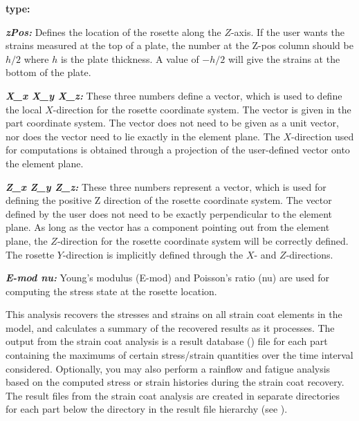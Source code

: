 {\begin{namelist}{\bf type:}
\item[\sl\textbf{zPos:}]
  Defines the location of the rosette along the $Z$-axis.
  If the user wants the strains measured at the top of a plate, the number at
  the Z-pos column should be $h/2$ where $h$ is the plate thickness.
  A value of $-h/2$ will give the strains at the bottom of the plate.

\item[\sl\textbf{X\_x X\_y X\_z:}]
  These three numbers define a vector, which is used to define the local
  $X$-direction for the rosette coordinate system. The vector is given in
  the part coordinate system. The vector does not need to be given as a unit
  vector, nor does the vector need to lie exactly in the element plane.
  The $X$-direction used for computations is obtained through a projection
  of the user-defined vector onto the element plane.

\item[\sl\textbf{Z\_x Z\_y Z\_z:}]
  These three numbers represent a vector, which is used for defining
  the positive Z direction of the rosette coordinate system.
  The vector defined by the user does not need to be exactly perpendicular
  to the element plane. As long as the vector has a component pointing
  out from the element plane, the $Z$-direction for the rosette coordinate
  system will be correctly defined.
  The rosette $Y$-direction is implicitly defined through the $X$-
  and $Z$-directions.

\item[\sl\textbf{E-mod nu:}] Young's modulus (E-mod) and Poisson's ratio (nu)
  are used for computing the stress state at the rosette location.
\end{namelist}



This analysis recovers the stresses and strains on all strain coat elements in
the model, and calculates a summary of the recovered results as it processes.
The output from the strain coat analysis is a result database ()
file for each part containing the maximums of certain stress/strain quantities
over the time interval considered.
Optionally, you may also perform a rainflow and fatigue analysis based on the
computed stress or strain histories during the strain coat recovery.
The result files from the strain coat analysis are created in separate
directories for each part below the  directory in
the result file hierarchy
(see ).

}
